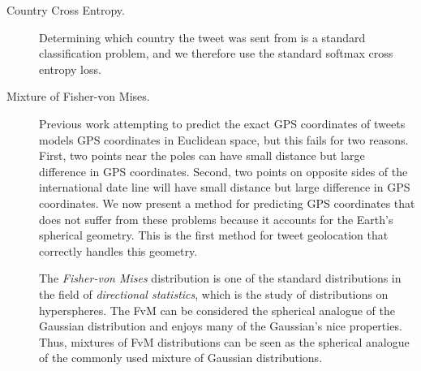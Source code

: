 \documentclass[sigconf,anonymous,review,10pt]{acmart}
\newcommand{\defn}[1]{\textit{#1}}
\begin{document}
\begin{description}

    \item[Country Cross Entropy.]
        Determining which country the tweet was sent from is a standard classification problem,
        and we therefore use the standard softmax cross entropy loss.

    \item[Mixture of Fisher-von Mises.]


        Previous work attempting to predict the exact GPS coordinates of tweets \citep{duong2016near} models GPS coordinates in Euclidean space,
        but this fails for two reasons.
        First, two points near the poles can have small distance but large difference in GPS coordinates.
        Second, two points on opposite sides of the international date line will have small distance but large difference in GPS coordinates.
        We now present a method for predicting GPS coordinates that does not suffer from these problems because it accounts for the Earth's spherical geometry.
        This is the first method for tweet geolocation that correctly handles this geometry.

        The \defn{Fisher-von Mises} distribution is one of the standard distributions in the field of \defn{directional statistics},
        which is the study of distributions on hyperspheres.
        The FvM can be considered the spherical analogue of the Gaussian distribution \citep[e.g.][]{mardia2009directional} and enjoys many of the Gaussian's nice properties.
        Thus, mixtures of FvM distributions can be seen as the spherical analogue of the commonly used mixture of Gaussian distributions.


\end{description}
\end{document}
